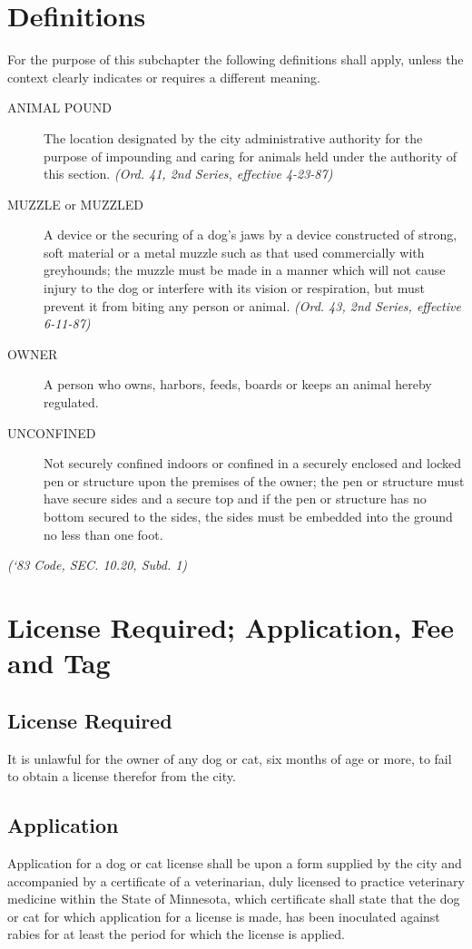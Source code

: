 \setcounter{section}{14}
\section{Definitions}
For the purpose of this subchapter the following definitions shall apply, unless the context clearly indicates or requires a different meaning.
\begin{description}
\item[ANIMAL POUND] The location designated by the city administrative authority for the purpose of impounding and caring for animals held under the authority of this section. \emph{(Ord. 41, 2nd Series, effective 4-23-87)}
\item[MUZZLE or MUZZLED] A device or the securing of a dog’s jaws by a device constructed of strong, soft material or a metal muzzle such as that used commercially with greyhounds; the muzzle must be made in a manner which will not cause injury to the dog or interfere with its vision or respiration, but must prevent it from biting any person or animal. \emph{(Ord. 43, 2nd Series, effective 6-11-87)}
\item[OWNER] A person who owns, harbors, feeds, boards or keeps an animal hereby regulated.
\item[UNCONFINED] Not securely confined indoors or confined in a securely enclosed and locked pen or structure upon the premises of the owner; the pen or structure must have secure sides and a secure top and if the pen or structure has no bottom secured to the sides, the sides must be embedded into the ground no less than one foot.
\end{description}
\emph{(‘83 Code, SEC. 10.20, Subd. 1)}
\section{License Required; Application, Fee and Tag}
\subsection{License Required}
It is unlawful for the owner of any dog or cat, six months of age or more, to fail to obtain a license therefor from the city.
\subsection{Application}
Application for a dog or cat license shall be upon a form supplied by the city and accompanied by a certificate of a veterinarian, duly licensed to practice veterinary medicine within the State of Minnesota, which certificate shall state that the dog or cat for which application for a license is made, has been inoculated against rabies for at least the period for which the license is applied.
